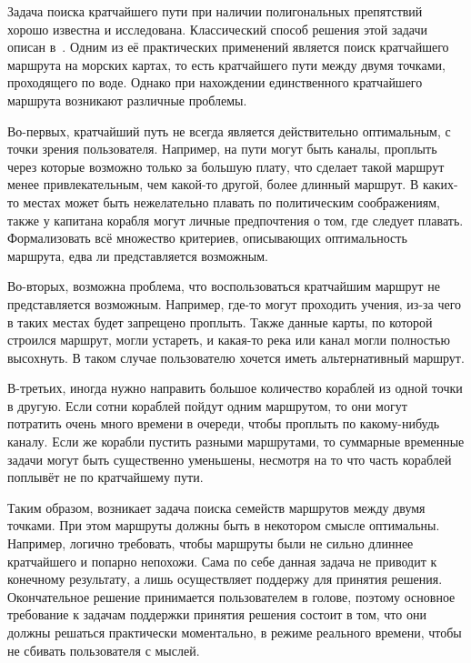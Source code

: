\startprefacepage

Задача поиска кратчайшего пути при наличии полигональных препятствий
хорошо известна и исследована. Классический способ решения этой задачи
описан в~\cite{de2000computational}. Одним из её практических применений является
поиск кратчайшего маршрута на морских картах, то есть кратчайшего пути
между двумя точками, проходящего по воде. Однако при нахождении
единственного кратчайшего маршрута возникают различные проблемы.

Во-первых, кратчайший путь не всегда является действительно
оптимальным, с точки зрения пользователя. Например, на пути могут быть
каналы, проплыть через которые возможно только за большую плату, что
сделает такой маршрут менее привлекательным, чем какой-то другой,
более длинный маршрут. В каких-то местах может быть нежелательно
плавать по политическим соображениям, также у капитана корабля могут
личные предпочтения о том, где следует плавать. Формализовать всё
множество критериев, описывающих оптимальность маршрута, едва ли
представляется возможным.

Во-вторых, возможна проблема, что воспользоваться кратчайшим маршрут
не представляется возможным. Например, где-то могут проходить учения,
из-за чего в таких местах будет запрещено проплыть. Также данные
карты, по которой строился маршрут, могли устареть, и какая-то река
или канал могли полностью высохнуть. В таком случае пользователю
хочется иметь альтернативный маршрут.

В-третьих, иногда нужно направить большое количество кораблей из одной
точки в другую. Если сотни кораблей пойдут одним маршрутом, то они
могут потратить очень много времени в очереди, чтобы проплыть по
какому-нибудь каналу. Если же корабли пустить разными маршрутами, то
суммарные временные задачи могут быть существенно уменьшены, несмотря
на то что часть кораблей поплывёт не по кратчайшему пути.

Таким образом, возникает задача поиска семейств маршрутов между двумя
точками. При этом маршруты должны быть в некотором смысле оптимальны.
Например, логично требовать, чтобы маршруты были не сильно длиннее
кратчайшего и попарно непохожи. Сама по себе данная задача не приводит
к конечному результату, а лишь осуществляет поддержу для принятия
решения. Окончательное решение принимается пользователем в голове,
поэтому основное требование к задачам поддержки принятия решения
состоит в том, что они должны решаться практически моментально, в
режиме реального времени, чтобы не сбивать пользователя с мыслей.

